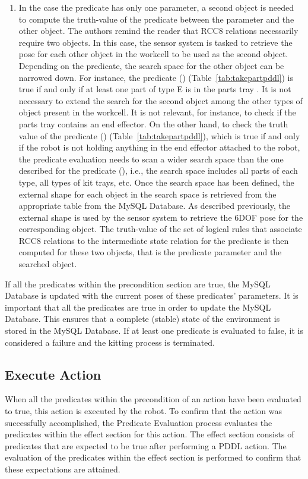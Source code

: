 \begin{enumerate}
\item In the case the predicate has only one parameter, a second object is needed to compute the truth-value of the predicate between the parameter and the other object. The authors remind the reader that RCC8 relations necessarily require two objects. In this case, the sensor system is tasked to retrieve the pose for each other object in the workcell to be used as the second object. Depending on the predicate, the search space for the other object can be narrowed down. For instance, the predicate () (Table~\ref{tab:takepartpddl}) is true if and only if at least one part of type E is in the parts tray . It is not necessary to extend the search for the second object among the other types of object present in the workcell. It is not relevant, for instance, to check if the parts tray contains an end effector. On the other hand, to check the truth value of the predicate () (Table~\ref{tab:takepartpddl}), which is true if and only if the robot  is not holding anything in the end effector attached to the robot, the predicate evaluation needs to scan a wider search space than the one described for the predicate (), i.e., the search space includes all parts of each type, all types of kit trays, etc. Once the search space has been defined, the external shape for each object in the search space is retrieved from the appropriate table from the \textsf{MySQL Database}. As described previously, the external shape is used by the sensor system to retrieve the 6DOF pose for the corresponding object. The truth-value of the set of logical rules that associate RCC8 relations to the intermediate state relation for the predicate is then computed for these two objects, that is the predicate parameter and the searched object.

\end{enumerate}

If all the predicates within the precondition section are true, the \textsf{MySQL Database} is updated with the current poses of these predicates' parameters. It is important that all the predicates are true in order to update the \textsf{MySQL Database}. This ensures that a complete (stable) state of the environment is stored in the \textsf{MySQL Database}. If at least one predicate is evaluated to false, it is considered a failure and the kitting process is terminated.

\subsection{Execute Action}
When all the predicates within the precondition of an action have been evaluated to true, this action is executed by the robot. To confirm that the action was successfully accomplished, the \textsf{Predicate Evaluation} process evaluates the predicates within the effect section for this action. The effect section consists of predicates that are expected to be true after performing a PDDL action. The evaluation of the predicates within the effect section is performed to confirm that these expectations are attained.

